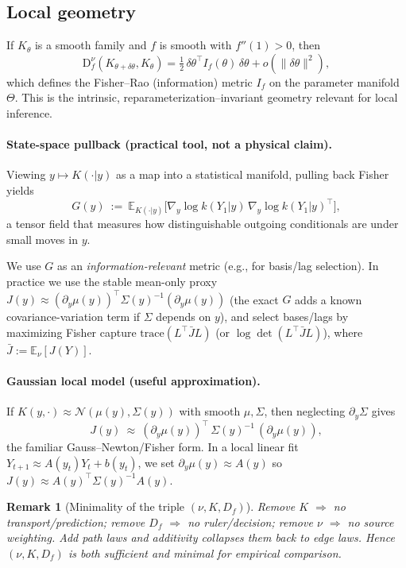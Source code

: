 \documentclass[11pt]{article}
\newtheorem{remark}{Remark}
\newcommand{\E}{\mathbb{E}}
\newcommand{\Df}{\mathrm{D}_f}
\newcommand{\1}{\mathbf{1}}
\begin{document}
\subsection{Local geometry}

If $K_\theta$ is a smooth family and $f$ is smooth with $f''(1)>0$, then
\[
\Df^\nu(K_{\theta+\delta\theta},K_\theta)=\tfrac12\,\delta\theta^\top I_f(\theta)\,\delta\theta+o(\|\delta\theta\|^2),
\]
which defines the Fisher–Rao (information) metric $I_f$ on the parameter manifold~$\Theta$. This is the intrinsic, reparameterization–invariant geometry relevant for local inference.

\paragraph{State-space pullback (practical tool, not a physical claim).}
Viewing $y\mapsto K(\cdot|y)$ as a map into a statistical manifold, pulling back Fisher yields
\[
G(y)\ :=\ \E_{K(\cdot|y)}\!\big[\nabla_y \log k(Y_1|y)\,\nabla_y \log k(Y_1|y)^\top\big],
\]
a tensor field that measures how distinguishable outgoing conditionals are under small moves in $y$.

We use $G$ as an \emph{information-relevant} metric (e.g., for basis/lag selection). In practice we use the stable mean-only proxy $J(y)\approx(\partial_y\mu(y))^\top\Sigma(y)^{-1}(\partial_y\mu(y))$ (the exact $G$ adds a known covariance-variation term if $\Sigma$ depends on $y$), and select bases/lags by maximizing Fisher capture $\mathrm{trace}(L^\top\bar J L)$ (or $\log\det(L^\top\bar J L)$), where $\bar J:=\E_\nu[J(Y)]$.

\paragraph{Gaussian local model (useful approximation).}
If $K(y,\cdot)\approx \mathcal N(\mu(y),\Sigma(y))$ with smooth $\mu,\Sigma$, then neglecting $\partial_y\Sigma$ gives
\[
J(y)\ \approx\ (\partial_y\mu(y))^\top\,\Sigma(y)^{-1}\,(\partial_y\mu(y)),
\]
the familiar Gauss--Newton/Fisher form. In a local linear fit $Y_{t+1}\approx A(y_t)Y_t+b(y_t)$,
we set $\partial_y\mu(y)\!\approx\!A(y)$ so $J(y)\!\approx\!A(y)^\top \Sigma(y)^{-1} A(y)$.

\begin{remark}[Minimality of the triple $(\nu,K,D_f)$]
Remove \(K\) \(\Rightarrow\) no transport/prediction; remove \(D_f\) \(\Rightarrow\) no ruler/decision; remove \(\nu\) \(\Rightarrow\) no source weighting. Add path laws and additivity collapses them back to edge laws. Hence $(\nu,K,D_f)$ is both sufficient and minimal for empirical comparison.
\end{remark}
\end{document}
